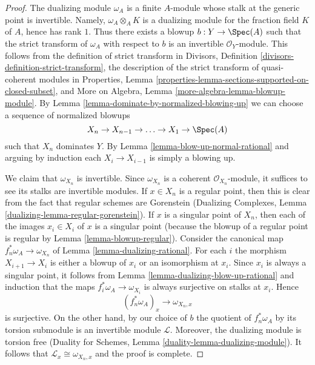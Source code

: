 \begin{proof}
The dualizing module $\omega_A$ is a finite $A$-module whose stalk at
the generic point is invertible. Namely, $\omega_A \otimes_A K$
is a dualizing module for the fraction field $K$ of $A$, hence has
rank $1$. Thus there exists a blowup $b : Y \to \Spec(A)$ such that
the strict transform of $\omega_A$ with respect to $b$ is an invertible
$\mathcal{O}_Y$-module. This follows from the definition of strict
transform in
Divisors, Definition \ref{divisors-definition-strict-transform},
the description of the strict transform of quasi-coherent modules in
Properties, Lemma
\ref{properties-lemma-sections-supported-on-closed-subset}, and
More on Algebra, Lemma \ref{more-algebra-lemma-blowup-module}.
By Lemma \ref{lemma-dominate-by-normalized-blowing-up}
we can choose a sequence of normalized blowups
$$
X_n \to X_{n - 1} \to \ldots \to X_1 \to \Spec(A)
$$
such that $X_n$ dominates $Y$. By Lemma \ref{lemma-blow-up-normal-rational}
and arguing by induction each $X_i \to X_{i - 1}$ is simply a blowing up.

\medskip\noindent
We claim that $\omega_{X_n}$ is invertible. Since $\omega_{X_n}$
is a coherent $\mathcal{O}_{X_n}$-module, it suffices to see its stalks
are invertible modules. If $x \in X_n$ is a regular point, then this is
clear from the fact that regular schemes are
Gorenstein (Dualizing Complexes, Lemma
\ref{dualizing-lemma-regular-gorenstein}). If $x$ is a singular point of
$X_n$, then each of the images $x_i \in X_i$ of $x$ is a singular point
(because the blowup of a regular point is regular by
Lemma \ref{lemma-blowup-regular}).
Consider the canonical map $f_n^*\omega_A \to \omega_{X_n}$ of
Lemma \ref{lemma-dualizing-rational}. For each $i$ the morphism
$X_{i + 1} \to X_i$ is either a blowup of $x_i$ or an isomorphism
at $x_i$. Since $x_i$ is always a singular point, it follows from
Lemma \ref{lemma-dualizing-blow-up-rational}
and induction that the maps $f_i^*\omega_A \to \omega_{X_i}$
is always surjective on stalks at $x_i$. Hence
$$
(f_n^*\omega_A)_x \longrightarrow \omega_{X_n, x}
$$
is surjective. On the other hand, by our choice of $b$ the quotient
of $f_n^*\omega_A$ by its torsion submodule is an invertible module
$\mathcal{L}$. Moreover, the dualizing module is torsion free
(Duality for Schemes, Lemma \ref{duality-lemma-dualizing-module}).
It follows that $\mathcal{L}_x \cong  \omega_{X_n, x}$ and the proof is
complete.
\end{proof}






